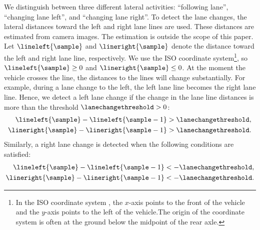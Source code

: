 We distinguish between three different lateral activities: ``following lane'', ``changing lane left'', and ``changing lane right''. 
To detect the lane changes, the lateral distances toward the left and right lane lines are used. 
These distances are estimated from camera images. 
The estimation is outside the scope of this paper. 
Let $\lineleft{\sample}$ and $\lineright{\sample}$ denote the distance toward the left and right lane line, respectively. 
\cstarta We use the ISO coordinate system\cenda\cstartc\footnote{\cstartc In the ISO coordinate system \autocite{iso8855}, the $x$-axis points to the front of the vehicle and the $y$-axis points to the left of the vehicle.\cendc\cstartd The origin of the coordinate system is often at the ground below the midpoint of the rear axle.\cendd}\cendc\cstarta, so $\lineleft{\sample} \geq 0$ and $\lineright{\sample} \leq 0$. 
At the moment the vehicle crosses the line, the distances to the lines will change substantially. 
For example, during a lane change to the left, the left lane line becomes the right lane line. 
Hence, we detect a left lane change \cstartd if the change in the lane line distances is more than the threshold $\lanechangethreshold>0$\cendd:
\begin{align}
	\lineleft{\sample} - \lineleft{\sample-1} &> \lanechangethreshold, \label{eq:potential left a} \\
	\lineright{\sample} - \lineright{\sample-1} &> \lanechangethreshold. \label{eq:potential left b}
\end{align}
Similarly, a right lane change is detected when the following conditions are satisfied:
\begin{align}
	\lineleft{\sample} - \lineleft{\sample-1} &< -\lanechangethreshold, \label{eq:potential right a}\\
	\lineright{\sample} - \lineright{\sample-1} &< -\lanechangethreshold. \label{eq:potential right b}
\end{align}

